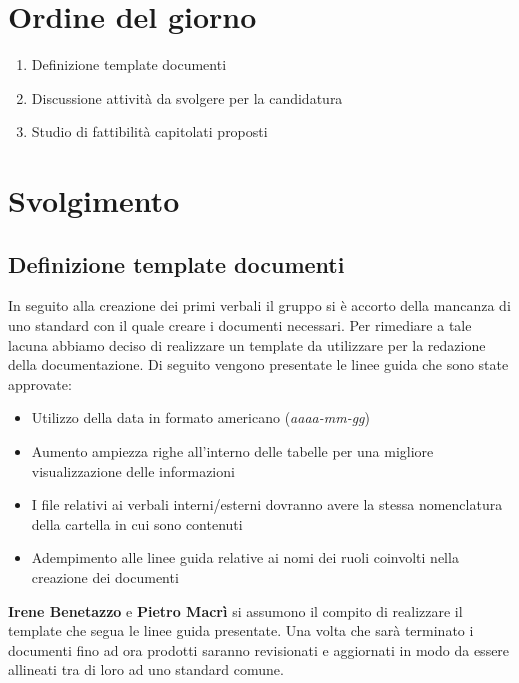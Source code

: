 \documentclass[12pt, a4paper,table]{article}
\begin{document}
	\section{Ordine del giorno}
	\begin{enumerate}
		\item Definizione template documenti
		\item Discussione attività da svolgere per la candidatura
		\item Studio di fattibilità capitolati proposti
	\end{enumerate}
	\newpage
	
	\section{Svolgimento}
		\subsection {Definizione template documenti}
		In seguito alla creazione dei primi verbali il gruppo si è accorto della mancanza di uno standard con il quale creare i documenti necessari. Per rimediare a tale lacuna abbiamo deciso di realizzare un template da utilizzare per la redazione della documentazione. Di seguito vengono presentate le linee guida che sono state approvate: 
		\begin{itemize}
			\item Utilizzo della data in formato americano (\textit{aaaa-mm-gg})
			\item Aumento ampiezza righe all'interno delle tabelle per una migliore visualizzazione delle informazioni
			\item I file relativi ai verbali interni/esterni dovranno avere la stessa nomenclatura della cartella in cui sono contenuti
			\item Adempimento alle linee guida relative ai nomi dei ruoli coinvolti nella creazione dei documenti
		\end{itemize}
		\textbf{Irene Benetazzo} e \textbf{Pietro Macrì} si assumono il compito di realizzare il template che segua le linee guida presentate. Una volta che sarà terminato i documenti fino ad ora prodotti saranno revisionati e aggiornati in modo da essere allineati tra di loro ad uno standard comune. 
		 
\end{document}
